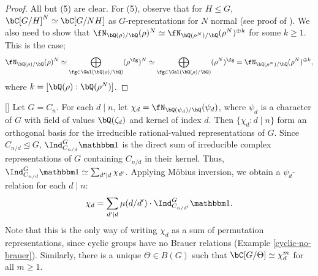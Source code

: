 \begin{proof}
    All but (5) are clear. For (5), observe that for $H \leq G$, $\bC[G / H]^N \simeq \bC[G / NH]$ as $G$-representations for $N$ normal (see proof of \cite[Theorem 2.8]{reg-const}). We also need to show that $\repnorm{\rho}^N \simeq \repnorm{\rho^N}^{\oplus k}$ for some $k \geq 1$. This is the case; 
    $$\repnorm{\rho}^N \simeq 
    \bigoplus_{\fg \in \Gal(\bQ(\rho) / \bQ)} (\rho^{\fg})^N \simeq \bigoplus_{\fg \in \Gal(\bQ(\rho) / \bQ)} (\rho^N)^{\fg} = \repnorm{\rho^N}^{\oplus k},$$
    where $k = [ \bQ(\rho) : \bQ(\rho^N)]$. 
\end{proof}


\begin{example}\label{cyclic-relns}[\cite[Exercise 13.1]{Serre}]
    Let $G = C_n$. For each $d \mid n$, let $\chi_d = \repnorm{\psi_d}$, where $\psi_d$ is a character of $G$ with field of values $\bQ(\zeta_d)$ and kernel of index $d$.
    Then $\{ \chi_d \colon d\mid n \}$ form an orthogonal basis for the irreducible rational-valued representations of $G$. Since $C_{n / d} \trianglelefteq G$, $\Ind_{C_{n/ d}}^G \trivial$ is the direct sum of irreducible complex representations of $G$ containing $C_{n / d}$ in their kernel. Thus, $\Ind_{C_{n/ d}}^G \trivial \simeq \sum_{d' \mid d} \chi_{d'}$. Applying M\"{o}bius inversion, we obtain a $\psi_d$-relation for each $d \mid n$:
    \[ \chi_d = \sum_{d' \mid d} \mu(d / d') \cdot \Ind_{C_{n/ d'}}^G \trivial. \]
    Note that this is the only way of writing $\chi_d$ as a sum of permutation representations, since cyclic groups have no Brauer relations (Example \ref{cyclic-no-brauer}). Similarly, there is a unique $\Theta \in B(G)$ such that $\bC[G / \Theta] \simeq \chi_d^{m}$ for all $m \geq 1$.
    \end{example}
